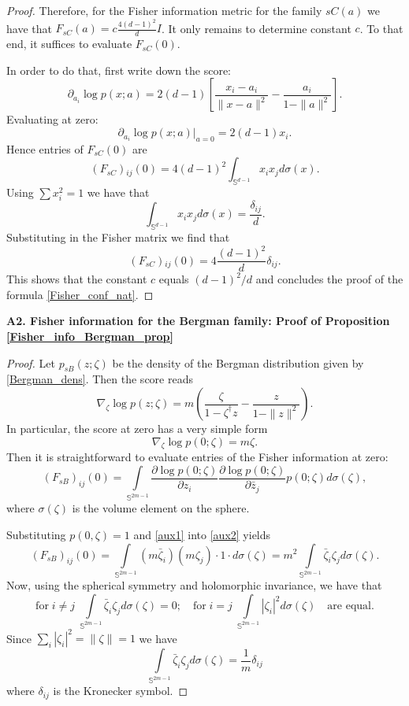 \documentclass{article}
\theoremstyle{plain}%
\theoremstyle{definition}
\theoremstyle{remark}
\theoremstyle{prop}
\begin{document}
\begin{appendices}
\begin{proof}
Therefore, for the Fisher information metric for the family $sC(a)$ we have that $F_{sC}(a) = c \frac{4 (d-1)^2}{d} I$. It only remains to determine constant $c$. To that end, it suffices to evaluate $F_{sC}(0)$.

In order to do that, first write down the score:
$$
\partial_{a_i} \log p(x;a) = 2 (d-1) \left[ \frac{x_i - a_i}{\| x- a \|^2} - \frac{a_i}{1 -\| a \|^2} \right].
$$
Evaluating at zero:
$$
\partial_{a_i} \log p(x;a) \bigg|_{a=0} = 2 (d-1) x_i.
$$
Hence entries of $F_{sC}(0)$ are
$$
(F_{sC}){_{ij}}(0) = 4 (d-1)^2 \int_{\mathbb{S}^{d-1}} x_i x_j d \sigma(x).
$$
Using $\sum x_i^2 = 1$ we have that 
$$
\int_{\mathbb S^{d-1}} x_i x_j d \sigma(x) = \frac{\delta_{ij}}{d}.
$$
Substituting in the Fisher matrix we find that 
$$
(F_{sC}){_{ij}}(0) = 4 \frac{(d-1)^2}{d} \delta_{ij}.
$$
This shows that the constant $c$ equals $(d-1)^2/d$ and concludes the proof of the formula \eqref{Fisher_conf_nat}.
\end{proof}

{\bf A2. Fisher information for the Bergman family: Proof of Proposition \ref{Fisher_info_Bergman_prop}}

\begin{proof}

Let $p_{sB}(z;\zeta)$ be the density of the Bergman distribution given by \eqref{Bergman_dens}. Then the score reads
$$
\nabla_\zeta \log p(z;\zeta) = m \left( \frac{\zeta}{1 - \zeta^\dagger z} - \frac{z}{1 - \| z \|^2} \right).
$$
In particular, the score at zero has a very simple form
\begin{equation}
\label{aux1}
\nabla_\zeta \log p(0;\zeta) = m \zeta.
\end{equation}
Then it is straightforward to evaluate entries of the Fisher information at zero:
\begin{equation}
\label{aux2}
(F_{sB})_{ij}(0) = \int \limits_{{\mathbb S}^{2m-1}} \frac{\partial \log p(0;\zeta)}{\partial z_i}  \frac{\partial \log p(0;\zeta)}{\partial \bar z_j} p(0;\zeta) d \sigma(\zeta),
\end{equation}
where $\sigma(\zeta)$ is the volume element on the sphere.

Substituting $p(0,\zeta) = 1$ and \eqref{aux1} into \eqref{aux2} yields
$$
(F_{sB})_{ij}(0) = \int \limits_{{\mathbb S}^{2m-1}} (m \bar \zeta_i)(m \zeta_j) \cdot 1 \cdot d \sigma(\zeta) = m^2 \int \limits_{{\mathbb S}^{2m-1}} \bar \zeta_i \zeta_j d \sigma(\zeta).
$$
Now, using the spherical symmetry and holomorphic invariance, we have that
$$
\mbox{for} \; i \neq j \; \int \limits_{{\mathbb S}^{2m-1}} \bar \zeta_i \zeta_j d \sigma(\zeta) = 0; \quad \mbox{for} \; i = j \; \int \limits_{{\mathbb S}^{2m-1}} |\zeta_i|^2 d \sigma(\zeta) \quad \mbox{are equal.}
$$
Since $\sum_i |\zeta_i|^2 = \| \zeta \| = 1$ we have
$$
\int \limits_{{\mathbb S}^{2m-1}} \bar \zeta_i \zeta_j d \sigma(\zeta) = \frac{1}{m} \delta_{ij}
$$
where $\delta_{ij}$ is the Kronecker symbol.


\end{proof}
\end{appendices}
\end{document}
